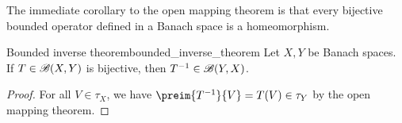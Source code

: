 The immediate corollary to the open mapping theorem is that every bijective bounded operator defined in a Banach space is a homeomorphism.
\begin{theorem}{Bounded inverse theorem}{bounded_inverse_theorem}
    Let \(X, Y\) be Banach spaces. If \(T \in \mathscr{B}(X, Y)\) is bijective, then \(T^{-1} \in \mathscr{B}(Y, X)\).
\end{theorem}
\begin{proof}
    For all \(V \in \tau_X\), we have \(\preim{T^{-1}}{V} = T(V) \in \tau_Y\) by the open mapping theorem.
\end{proof}
